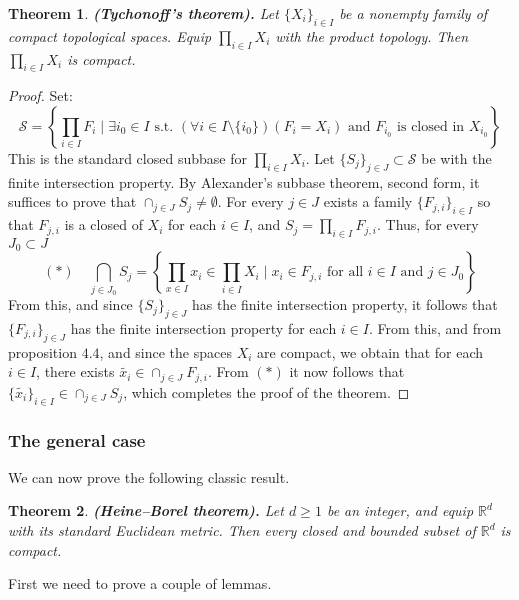 \documentclass[11pt,a4paper]{article}
\theoremstyle{definition}
\theoremstyle{plain}
\newtheorem{theorem}{Theorem}[section]
\newcommand{\st}{\text{ s.t. }}
\newcommand{\R}{\mathbb{R}}
\newcommand{\set}[2]{ \left\{ #1 \mid #2 \right\} }
\renewcommand{\tt}[1]{\textnormal{\textbf{(#1).}}} %
\begin{document}
  \begin{theorem}
    \tt{Tychonoff’s theorem}
    Let $\{X_i\}_{i \in I}$ be a nonempty family of compact topological 
    spaces. Equip $\prod_{i \in I}{X_i}$ with the product topology. Then 
    $\prod_{i \in I}{X_i}$ is compact.
  \end{theorem}
  \begin{proof}
    Set:
    \[
      \mathcal{S} = 
      \left\{\prod_{i \in I}{F_i} \mid \exists i_0 \in I \st
      (\forall i \in I \setminus \{i_0\})(F_i = X_i) \text{ and }
      F_{i_0} \text{ is closed in } X_{i_0}
      \right\}
    \]
    This is the standard closed subbase for $\prod_{i \in I}{X_i}$.
    Let $\{S_j\}_{j \in J} \subset \mathcal{S}$ be with the finite
    intersection property. By Alexander's subbase theorem, second form, 
    it suffices to prove that $\cap_{j \in J}{S_j} \neq \emptyset$.
    For every $j \in J$ exists a family $\{F_{j,i}\}_{i \in I}$ so that
    $F_{j,i}$ is a closed of $X_i$ for each $i \in I$, and 
    $S_j = \prod_{i \in I}{F_{j,i}}$. Thus, for every $J_0 \subset J$
    \[
      (*) \quad \bigcap_{j \in J_0}{{S}_j} = 
      \set{\prod_{x \in I}{x_i} \in \prod_{i \in I}{X_i}}
      {x_i \in F_{j,i} \text{ for all $i \in I$ and $j \in J_0$}}
    \]
    From this, and since $\{S_j\}_{j \in J}$ has the finite intersection
    property, it follows that $\{F_{j,i}\}_{j \in J}$ has the finite
    intersection property for each $i \in I$. From this, and from 
    proposition $4.4$, and since the spaces $X_i$ are compact, we obtain
    that for each $i \in I$, there exists 
    $\tilde{x_i} \in \cap_{j \in J}{F_{j,i}}$. From $(*)$ it now follows
    that $\{\tilde{x_i}\}_{i \in I} \in \cap_{j \in J}{{S}_j}$, which
    completes the proof of the theorem.
  \end{proof}

  \subsubsection{The general case}

  We can now prove the following classic result.

  \begin{theorem}\label{thm:heine-borel}
    \tt{Heine–Borel theorem}
    Let $d \geq 1$ be an integer, and equip $\R^d$ with its standard 
    Euclidean metric. Then every closed and bounded subset of $\R^d$ is
    compact.
  \end{theorem}

  First we need to prove a couple of lemmas.
\end{document}
